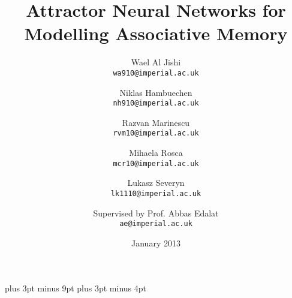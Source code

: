 \documentclass[11pt,a4paper,oneside]{report}
\title{Attractor Neural Networks for Modelling Associative Memory}
\date{January 2013}
\author{
  Wael Al Jishi\\
  \texttt{wa910@imperial.ac.uk}
  \and
  Niklas Hambuechen\\
  \texttt{nh910@imperial.ac.uk}
  \and
  Razvan Marinescu\\
  \texttt{rvm10@imperial.ac.uk}
  \and
  Mihaela Rosca\\
  \texttt{mcr10@imperial.ac.uk}
  \and
  Lukasz Severyn\\
  \texttt{lk1110@imperial.ac.uk}
  \vspace{2cm}
  \and
  Supervised by Prof. Abbas Edalat\\
  \texttt{ae@imperial.ac.uk}
  \vspace{2cm}
}
\begin{document}
\belowdisplayskip=12pt plus 3pt minus 9pt
\belowdisplayshortskip=7pt plus 3pt minus 4pt







\maketitle{}


\renewcommand{\abstractname}{Executive Summary}



\tableofcontents



















\nocite{*} %





\appendix



\end{document}
